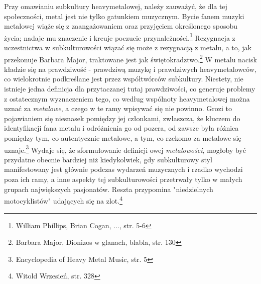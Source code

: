 \documentclass[12pt, a4paper, titlepage]{report}
\begin{document}
Przy omawianiu subkultury heavymetalowej, należy zauważyć, że dla tej społeczności, metal jest nie tylko gatunkiem muzycznym. Bycie fanem muzyki metalowej wiąże się z zaangażowaniem oraz przyjęciem określonego sposobu życia; nadaje mu znaczenie i kreuje poczucie przynależności.\footnote{William Phillips, Brian Cogan, ..., str. 5-6} Rezygnacja z uczestnictwa w subkulturowości wiązać się może z rezygnacją z metalu, a to, jak przekonuje Barbara Major, traktowane jest jak świętokradztwo.\footnote{Barbara Major, Dionizos w glanach, blabla, str. 130} W metalu nacisk kładzie się na prawdziwość - prawdziwą muzykę i prawdziwych heavymetalowców, co wielokrotnie podkreślane jest przez współtwórców subkultury. Niestety, nie istnieje jedna definicja dla przytaczanej tutaj prawdziwości, co generuje problemy z ostatecznym wyznaczeniem tego, co według wspólnoty heavymetalowej można uznać za \emph{metalowe}, a czego w te ramy wpisywać się nie powinno. Grozi to pojawianiem się niesnasek pomiędzy jej członkami, zwłaszcza, że kluczem do identyfikacji fana metalu i odróżnienia go od pozera, od zawsze była różnica pomiędzy tym, co autentycznie metalowe, a tym, co rzekomo za metalowe się uznaje.\footnote{Encyclopedia of Heavy Metal Music, str. 5} Wydaje się, że sformułowanie definicji owej \emph{metalowości}, mogłoby być przydatne obecnie bardziej niż kiedykolwiek, gdy subkulturowy styl  manifestowany jest głównie podczas wydarzeń muzycznych i rzadko wychodzi poza ich ramy, a inne aspekty tej subkulturowości przetrwały tylko w małych grupach największych pasjonatów. Reszta przypomina "niedzielnych motocyklistów" udających się na zlot.\footnote{Witold Wrzesień, str. 328}
\end{document}
